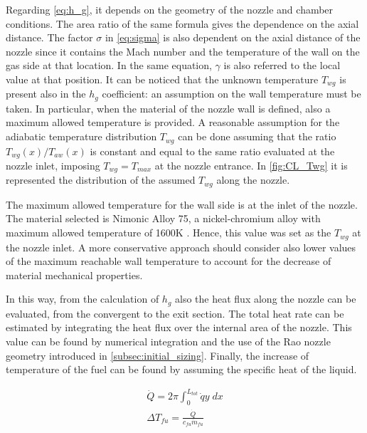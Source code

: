 \vspace{3mm}
Regarding \autoref{eq:h_g}, it depends on the geometry of the nozzle and chamber conditions. The area ratio of the same formula gives the dependence on the axial distance. The factor $\sigma$ in \autoref{eq:sigma} is also dependent on the axial distance of the nozzle since it contains the Mach number and the temperature of the wall on the gas side at that location. In the same equation, $\gamma$ is also referred to the local value at that position. It can be noticed that the unknown temperature $T_{wg}$ is present also in the $h_g$ coefficient: an assumption on the wall temperature must be taken. In particular, when the material of the nozzle wall is defined, also a maximum allowed temperature is provided. A reasonable assumption for the adiabatic temperature distribution  $T_{wg}$ can be done assuming that the ratio  $T_{wg} (x) / T_{aw} (x)$ is constant and equal to the same ratio evaluated at the nozzle inlet, imposing $T_{wg} = T_{max}$ at the nozzle entrance.
In \autoref{fig:CL_Twg} it is represented the distribution of the assumed $T_{wg}$ along the nozzle.


The maximum allowed temperature for the wall side is at the inlet of the nozzle. The material selected is Nimonic Alloy 75, a nickel-chromium alloy with maximum allowed temperature of 1600K \cite{nimonic}. Hence, this value was set as the $T_{wg}$ at the nozzle inlet. A more conservative approach should consider also lower values of the maximum reachable wall temperature to account for the decrease of material mechanical properties.

In this way, from the calculation of $h_g$ also the heat flux along the nozzle can be evaluated, from the convergent to the exit section.
The total heat rate can be estimated by integrating the heat flux over the internal area of the nozzle. This value can be found by numerical integration and the use of the Rao nozzle geometry introduced in \autoref{subsec:initial_sizing}. Finally, the increase of temperature of the fuel can be found by assuming the specific heat of the liquid.

\begin{gather}
    \dot{Q} = 2 \pi \int_{0}^{L_{tot}} \dot{q} y \; dx
    \\
    \Delta T_{fu} = \frac{\dot{Q}}{c_{fu} \dot{m}_{fu}}
\end{gather}

